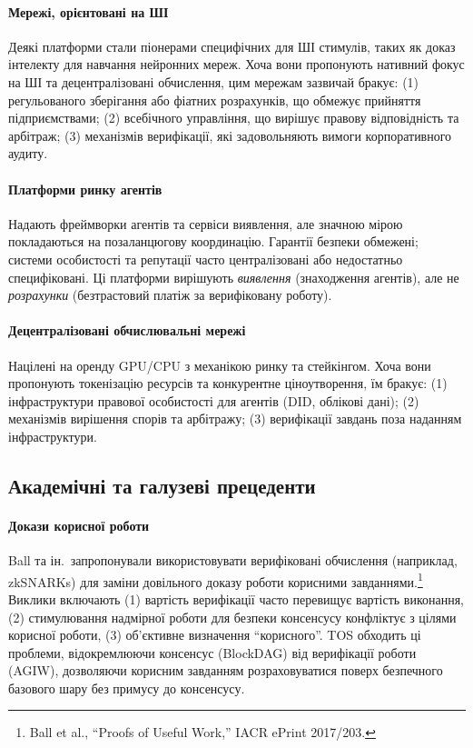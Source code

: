 \documentclass[11pt]{article}
\begin{document}
\paragraph{Мережі, орієнтовані на ШІ} Деякі платформи стали піонерами специфічних для ШІ стимулів, таких як доказ інтелекту для навчання нейронних мереж. Хоча вони пропонують нативний фокус на ШІ та децентралізовані обчислення, цим мережам зазвичай бракує: (1) регульованого зберігання або фіатних розрахунків, що обмежує прийняття підприємствами; (2) всебічного управління, що вирішує правову відповідність та арбітраж; (3) механізмів верифікації, які задовольняють вимоги корпоративного аудиту.

\paragraph{Платформи ринку агентів} Надають фреймворки агентів та сервіси виявлення, але значною мірою покладаються на позаланцюгову координацію. Гарантії безпеки обмежені; системи особистості та репутації часто централізовані або недостатньо специфіковані. Ці платформи вирішують \emph{виявлення} (знаходження агентів), але не \emph{розрахунки} (безтрастовий платіж за верифіковану роботу).

\paragraph{Децентралізовані обчислювальні мережі} Націлені на оренду GPU/CPU з механікою ринку та стейкінгом. Хоча вони пропонують токенізацію ресурсів та конкурентне ціноутворення, їм бракує: (1) інфраструктури правової особистості для агентів (DID, облікові дані); (2) механізмів вирішення спорів та арбітражу; (3) верифікації завдань поза наданням інфраструктури.

\subsection{Академічні та галузеві прецеденти}
\paragraph{Докази корисної роботи} Ball та ін.\ запропонували використовувати верифіковані обчислення (наприклад, zkSNARKs) для заміни довільного доказу роботи корисними завданнями.\footnote{Ball et al., ``Proofs of Useful Work,'' IACR ePrint 2017/203.} Виклики включають (1) вартість верифікації часто перевищує вартість виконання, (2) стимулювання надмірної роботи для безпеки консенсусу конфліктує з цілями корисної роботи, (3) об'єктивне визначення ``корисного''. TOS обходить ці проблеми, відокремлюючи консенсус (BlockDAG) від верифікації роботи (AGIW), дозволяючи корисним завданням розраховуватися поверх безпечного базового шару без примусу до консенсусу.
\end{document}

